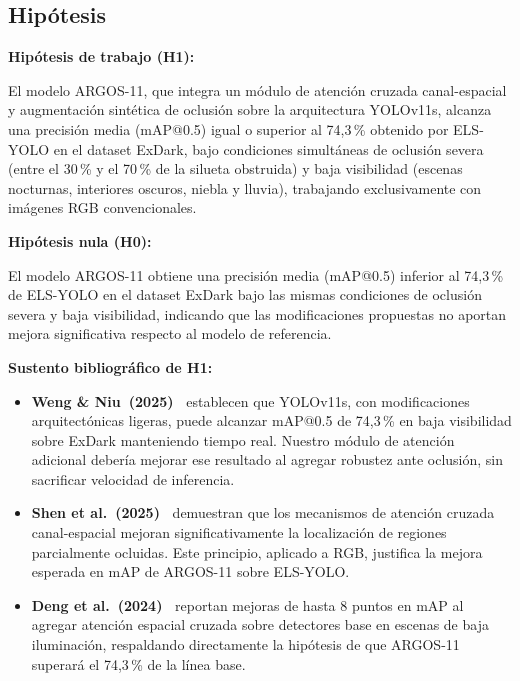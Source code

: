 \subsection{Hip\'otesis}

\textbf{Hip\'otesis de trabajo (H1):}

El modelo ARGOS-11, que integra un m\'odulo de atenci\'on cruzada
canal-espacial y augmentaci\'on sint\'etica de oclusi\'on sobre la
arquitectura YOLOv11s, alcanza una precisi\'on media (mAP@0.5)
igual o superior al 74{,}3\,\% obtenido por ELS-YOLO en el dataset
ExDark, bajo condiciones simult\'aneas de oclusi\'on severa (entre
el 30\,\% y el 70\,\% de la silueta obstruida) y baja visibilidad
(escenas nocturnas, interiores oscuros, niebla y lluvia), trabajando
exclusivamente con im\'agenes RGB convencionales.

\bigskip
\textbf{Hip\'otesis nula (H0):}

El modelo ARGOS-11 obtiene una precisi\'on media (mAP@0.5) inferior
al 74{,}3\,\% de ELS-YOLO en el dataset ExDark bajo las mismas
condiciones de oclusi\'on severa y baja visibilidad, indicando que
las modificaciones propuestas no aportan mejora significativa
respecto al modelo de referencia.

\bigskip
\textbf{Sustento bibliogr\'afico de H1:}

\begin{itemize}
\item \textbf{Weng \& Niu~(2025)~\cite{ElsYolo2025}} establecen
      que YOLOv11s, con modificaciones arquitect\'onicas ligeras,
      puede alcanzar mAP@0.5 de 74{,}3\,\% en baja visibilidad sobre
      ExDark manteniendo tiempo real. Nuestro m\'odulo de atenci\'on
      adicional deber\'{i}a mejorar ese resultado al agregar
      robustez ante oclusi\'on, sin sacrificar velocidad de
      inferencia.

\item \textbf{Shen et al.~(2025)~\cite{Shen2025}} demuestran que
      los mecanismos de atenci\'on cruzada canal-espacial mejoran
      significativamente la localizaci\'on de regiones parcialmente
      ocluidas. Este principio, aplicado a RGB, justifica la mejora
      esperada en mAP de ARGOS-11 sobre ELS-YOLO.

\item \textbf{Deng et al.~(2024)~\cite{Deng2024}} reportan mejoras
      de hasta 8 puntos en mAP al agregar atenci\'on espacial
      cruzada sobre detectores base en escenas de baja iluminaci\'on,
      respaldando directamente la hip\'otesis de que ARGOS-11
      superar\'a el 74{,}3\,\% de la l\'{i}nea base.
\end{itemize}

